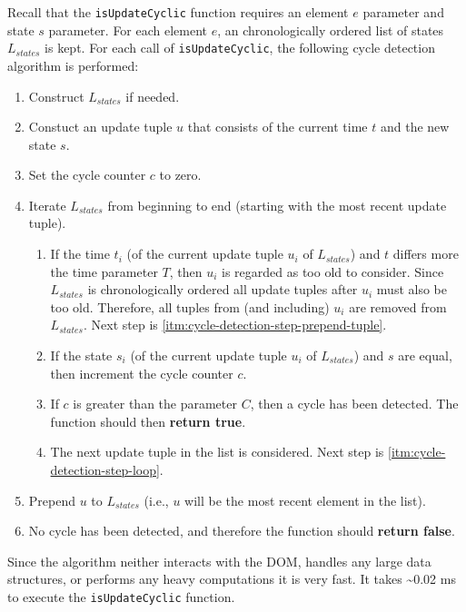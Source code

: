 \documentclass[a4paper,11pt]{kth-mag}
\newcommand{\code}[1]{\texttt{#1}}
\begin{document}
        Recall that the \code{isUpdateCyclic} function requires an element $e$ parameter and state $s$ parameter.
        For each element $e$, an chronologically ordered list of states $L_{states}$ is kept.
        For each call of \code{isUpdateCyclic}, the following cycle detection algorithm is performed:
        \begin{enumerate}
          \item Construct $L_{states}$ if needed.
          \item Constuct an update tuple $u$ that consists of the current time $t$ and the new state $s$.
          \item Set the cycle counter $c$ to zero.
          \item Iterate $L_{states}$ from beginning to end (starting with the most recent update tuple).
          \begin{enumerate}
            \item\label{itm:cycle-detection-step-loop}
              If the time $t_i$ (of the current update tuple $u_i$ of $L_{states}$) and $t$ differs more the time parameter $T$, then $u_i$ is regarded as too old to consider.
              Since $L_{states}$ is chronologically ordered all update tuples after $u_i$ must also be too old.
              Therefore, all tuples from (and including) $u_i$ are removed from $L_{states}$. Next step is \ref{itm:cycle-detection-step-prepend-tuple}.
            \item If the state $s_i$ (of the current update tuple $u_i$ of $L_{states}$) and $s$ are equal, then increment the cycle counter $c$.
            \item If $c$ is greater than the parameter $C$, then a cycle has been detected. The function should then \textbf{return true}.
            \item The next update tuple in the list is considered. Next step is \ref{itm:cycle-detection-step-loop}.
          \end{enumerate}
          \item\label{itm:cycle-detection-step-prepend-tuple} Prepend $u$ to $L_{states}$ (i.e., $u$ will be the most recent element in the list).
          \item No cycle has been detected, and therefore the function should \textbf{return false}.
        \end{enumerate}
        Since the algorithm neither interacts with the \gls{DOM}, handles any large data structures, or performs any heavy computations it is very fast.
        It takes \textasciitilde0.02 ms to execute the \code{isUpdateCyclic} function.
\end{document}
